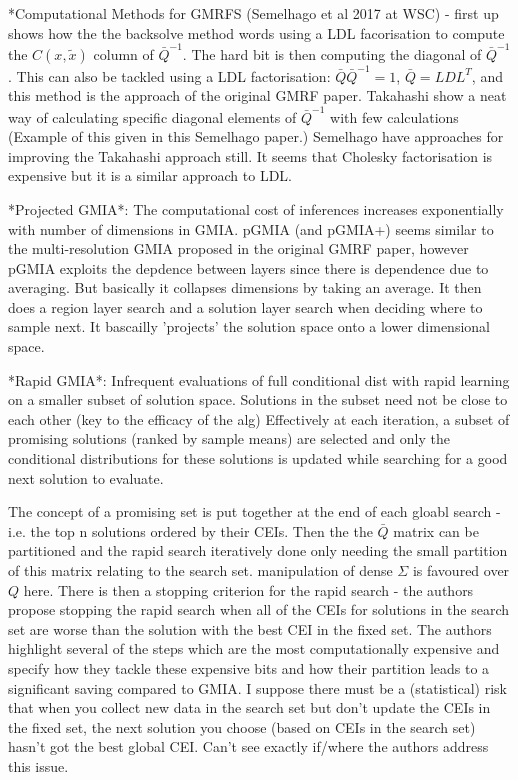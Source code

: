 \documentclass{article}
\begin{document}
*Computational Methods for GMRFS (Semelhago et al 2017 at WSC) - first up shows how the the backsolve method words using a LDL facorisation to compute the $C(x,\tilde{x})$ column of $\bar{Q}^{-1}$. The hard bit is then computing the diagonal of $\bar{Q}^{-1}$. This can also be tackled using a LDL factorisation: $\bar{Q}\bar{Q}^{-1}=1$, $\bar{Q} = LDL^{T}$, and this method is the approach of the original GMRF paper. Takahashi show a neat way of calculating specific diagonal elements of $\bar{Q}^{-1}$ with few calculations (Example of this given in this Semelhago paper.) Semelhago have approaches for improving the Takahashi approach still. It seems that Cholesky factorisation is expensive but it is a similar approach to LDL.

*Projected GMIA*: The computational cost of inferences increases exponentially with number of dimensions in GMIA. pGMIA (and pGMIA+) seems similar to the multi-resolution GMIA proposed in the original GMRF paper, however pGMIA exploits the depdence between layers since there is dependence due to averaging. But basically it collapses dimensions by taking an average. It then does a region layer search and a solution layer search when deciding where to sample next. It bascailly 'projects' the solution space onto a lower dimensional space. \newline

*Rapid GMIA*: Infrequent evaluations of full conditional dist with rapid learning on a smaller subset of solution space. Solutions in the subset need not be close to each other (key to the efficacy of the alg) Effectively at each iteration, a subset of promising solutions (ranked by sample means) are selected and only the conditional distributions for these solutions is updated while searching for a good next solution to evaluate. \newline

The concept of a promising set is put together at the end of each gloabl search - i.e. the top n solutions ordered by their CEIs. Then the the $\bar{Q}$ matrix can be partitioned and the rapid search iteratively done only needing the small partition of this matrix relating to the search set. manipulation of dense $\Sigma$ is favoured over $Q$ here. There is then a stopping criterion for the rapid search - the authors propose stopping the rapid search when all of the CEIs for solutions in the search set are worse than the solution with the best CEI in the fixed set. The authors highlight several of the steps which are the most computationally expensive and specify how they tackle these expensive bits and how their partition leads to a significant saving compared to GMIA. I suppose there must be a (statistical) risk that when you collect new data in the search set but don't update the CEIs in the fixed set, the next solution you choose (based on CEIs in the search set) hasn't got the best global CEI. Can't see exactly if/where the authors address this issue.
\end{document}
